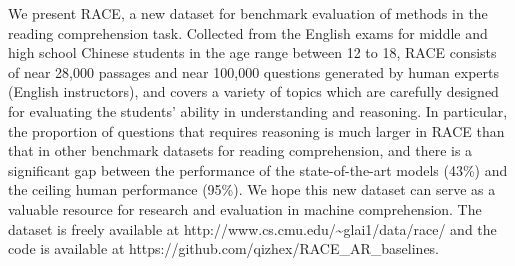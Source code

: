 We present RACE, a new dataset for benchmark evaluation of methods in the reading comprehension task. Collected from the English exams for middle and high school Chinese students in the age range between 12 to 18, RACE consists of near 28,000 passages and near 100,000 questions generated by human experts (English instructors), and covers a variety of topics which are carefully designed for evaluating the students' ability in  understanding and reasoning. In particular, the proportion of questions that requires reasoning is much larger in RACE than that in other benchmark datasets for reading comprehension, and there is a significant gap between the performance of the state-of-the-art models (43\%) and the ceiling human performance (95\%). We hope this new dataset can serve as a valuable resource for research and evaluation in machine comprehension. The dataset is freely available at http://www.cs.cmu.edu/{\textasciitilde}glai1/data/race/ and the code is available at https://github.com/qizhex/RACE\_AR\_baselines.
